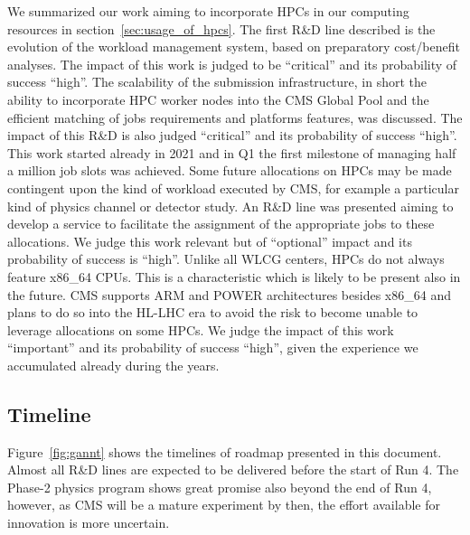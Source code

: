 \documentclass{cmspaper}
\begin{document}
We summarized our work aiming to incorporate HPCs in our computing resources in section~\ref{sec:usage_of_hpcs}. The first R\&D line described is the evolution of the workload management system, based on preparatory cost/benefit analyses. The impact of this work is judged to be ``critical'' and its probability of success ``high''. The scalability of the submission infrastructure, in short the ability to incorporate HPC worker nodes into the CMS Global Pool and the efficient matching of jobs requirements and platforms features, was discussed. The impact of this R\&D is also judged ``critical'' and its probability of success ``high''. This work started already in 2021 and in Q1 the first milestone of managing half a million job slots was achieved. Some future allocations on HPCs may be made contingent upon the kind of workload executed by CMS, for example a particular kind of physics channel or detector study. An R\&D line was presented aiming to develop a service to facilitate the assignment of the appropriate jobs to these allocations. We judge this work relevant but of ``optional'' impact and its probability of success is ``high''. Unlike all WLCG centers, HPCs do not always feature x86\_64 CPUs. This is a characteristic which is likely to be present also in the future. CMS supports ARM and POWER architectures besides x86\_64 and plans to do so into the HL-LHC era to avoid the risk to become unable to leverage allocations on some HPCs. We judge the impact of this work ``important'' and its probability of success ``high'', given the experience we accumulated already during the years.

\subsection{Timeline}
Figure~\ref{fig:gannt} shows the timelines of roadmap presented in this document.
Almost all R\&D lines are expected to be delivered before the start of Run 4. 
The Phase-2 physics program shows great promise also beyond the end of Run 4, however, as CMS will be a mature experiment by then, the effort available for innovation is more uncertain.
\end{document}
